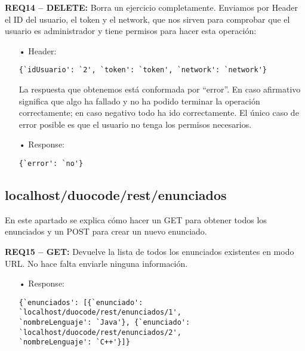 \textbf{REQ14 – DELETE:} Borra un ejercicio completamente. Enviamos por Header el ID del usuario, el token y el network, que nos sirven para comprobar que el usuario es administrador y tiene permisos para hacer esta operación:
\begin{itemize}
\item[•]
Header: 
{\codesize
\begin{verbatim}
{`idUsuario': `2', `token': `token', `network': `network'}
\end{verbatim}
}

La respuesta que obtenemos está conformada por ``error''. En caso afirmativo significa que algo ha fallado y no ha podido terminar la operación correctamente; en caso negativo todo ha ido correctamente. El único caso de error posible es que el usuario no tenga los permisos necesarios.
\item[•]
Response: 
{\codesize
\begin{verbatim}
{`error': `no'}
\end{verbatim}
}
\end{itemize}

\subsection{localhost/duocode/rest/enunciados}
En este apartado se explica cómo hacer un GET para obtener todos los enunciados y un POST para crear un nuevo enunciado.

\textbf{REQ15 – GET:} Devuelve la lista de todos los enunciados existentes en modo URL. No hace falta enviarle ninguna información.
\begin{itemize}
\item[•]
Response:
{\codesize
\begin{verbatim}
{`enunciados': [{`enunciado': `localhost/duocode/rest/enunciados/1', 
`nombreLenguaje': `Java'}, {`enunciado': `localhost/duocode/rest/enunciados/2', 
`nombreLenguaje': `C++'}]}
\end{verbatim}
}
\end{itemize}

